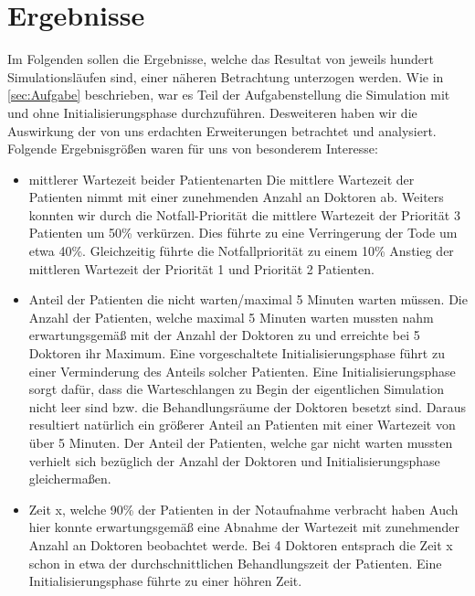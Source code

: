 \documentclass[12pt,fleqn,a4paper]{article}
\begin{document}
\newpage

\section{Ergebnisse}
Im Folgenden sollen die Ergebnisse, welche das Resultat von jeweils hundert Simulationsl\"{a}ufen sind, einer n\"{a}heren Betrachtung unterzogen werden.
Wie in \ref{sec:Aufgabe} beschrieben, war es Teil der Aufgabenstellung die Simulation mit und ohne Initialisierungsphase durchzuf\"{u}hren.
Desweiteren haben wir die Auswirkung  der von uns erdachten Erweiterungen betrachtet und analysiert.
Folgende Ergebnisgr\"{o}{\ss}en waren f\"{u}r uns von besonderem Interesse:
\begin{itemize}

	\item mittlerer Wartezeit beider Patientenarten\newline
	Die mittlere Wartezeit der Patienten nimmt mit einer zunehmenden Anzahl an Doktoren ab.
	Weiters konnten wir durch die Notfall-Priorit\"{a}t die mittlere Wartezeit der Priorit\"{a}t 3 Patienten um 50\% verk\"{u}rzen. Dies f\"{u}hrte zu eine
	Verringerung der Tode um etwa 40\%. Gleichzeitig f\"{u}hrte die Notfallpriorit\"{a}t zu einem 10\% Anstieg der mittleren Wartezeit der Priorit\"{a}t 1 und Priorit\"{a}t 2 Patienten. 
	\item Anteil der Patienten die nicht warten/maximal 5 Minuten warten m\"{u}ssen.\newline
	Die Anzahl der Patienten, welche maximal 5 Minuten warten mussten nahm erwartungsgem\"{a}{\ss} mit der Anzahl der Doktoren zu und erreichte bei 5 Doktoren ihr Maximum. Eine vorgeschaltete Initialisierungsphase f\"{u}hrt zu einer Verminderung des Anteils solcher Patienten.
Eine Initialisierungsphase sorgt daf\"{u}r, dass die Warteschlangen zu Begin der eigentlichen Simulation nicht leer sind bzw.
 die Behandlungsr\"{a}ume der Doktoren besetzt sind. Daraus resultiert nat\"{u}rlich ein gr\"{o}{\ss}erer Anteil an Patienten mit einer Wartezeit von \"{u}ber 5 Minuten. 
	Der Anteil der Patienten, welche gar nicht warten mussten verhielt sich bez\"{u}glich der Anzahl der Doktoren und Initialisierungsphase gleicherma{\ss}en.

	\item Zeit x, welche 90\% der Patienten in der Notaufnahme verbracht haben
	Auch hier konnte erwartungsgem\"{a}{\ss} eine Abnahme der Wartezeit mit zunehmender Anzahl an Doktoren beobachtet werde. Bei 4 Doktoren entsprach die Zeit x schon in etwa der durchschnittlichen Behandlungszeit der Patienten. 
Eine Initialisierungsphase f\"{u}hrte zu einer h\"{o}hren Zeit.


\end{itemize}
\end{document}
